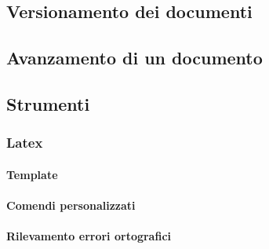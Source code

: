 \documentclass[../NormeProgetto.tex]{subfiles}
\begin{document}
	\subsection{Versionamento dei documenti}
	\subsection{Avanzamento di un documento}
	\subsection{Strumenti}
		\subsubsection{Latex}
			\paragraph{Template}
			\paragraph{Comendi personalizzati}
			\paragraph{Rilevamento errori ortografici}
			
			
			
\end{document}
